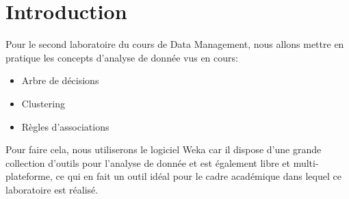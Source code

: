 \chapter*{Introduction}

Pour le second laboratoire du cours de Data Management, nous allons mettre en pratique les concepts d'analyse de donnée vus en cours:

\begin{itemize}
	\item Arbre de décisions
	\item Clustering
	\item Règles d'associations
\end{itemize}

Pour faire cela, nous utiliserons le logiciel Weka car il dispose d'une grande collection d'outils pour l'analyse de donnée et est également libre et multi-plateforme, ce qui en fait un outil idéal pour le cadre académique dans lequel ce laboratoire est réalisé.
